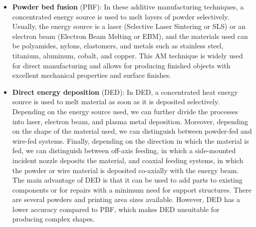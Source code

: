 \begin{itemize}
    \item \textbf{Powder bed fusion} (PBF):  In these additive manufacturing techniques, a concentrated energy source is used to melt layers of powder selectively. Usually, the energy source is a laser (Selective Laser Sintering or SLS) or an electron beam (Electron Beam Melting or EBM), and the materials used can be polyamides, nylons, elastomers, and metals such as stainless steel, titanium, aluminum, cobalt, and copper. This AM technique is widely used for direct manufacturing and allows for producing finished objects with excellent mechanical properties and surface finishes.
    \item \textbf{Direct energy deposition} (DED): In DED, a concentrated heat energy source is used to melt material as soon as it is deposited selectively. Depending on the energy source used, we can further divide the processes into laser, electron beam, and plasma metal deposition. Moreover, depending on the shape of the material used, we can distinguish between powder-fed and wire-fed systems. Finally, depending on the direction in which the material is fed, we can distinguish between off-axis feeding, in which a side-mounted incident nozzle deposits the material, and coaxial feeding systems, in which the powder or wire material is deposited co-axially with the energy beam. The main advantage of DED is that it can be used to add parts to existing components or for repairs with a minimum need for support structures. There are several powders and printing area sizes available. However, DED has a lower accuracy compared to PBF, which makes DED unsuitable for producing complex shapes.
    \end{itemize}



